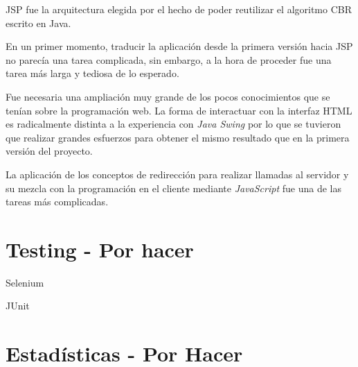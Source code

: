 JSP fue la arquitectura elegida por el hecho de poder reutilizar el algoritmo CBR escrito en Java.

En un primer momento, traducir la aplicación desde la primera versión hacia JSP no parecía una tarea complicada, sin embargo, a la hora de proceder fue una tarea más larga y tediosa de lo esperado.

Fue necesaria una ampliación muy grande de los pocos conocimientos que se tenían sobre la programación web. La forma de interactuar con la interfaz HTML es radicalmente distinta a la experiencia con \emph{Java Swing} por lo que se tuvieron que realizar grandes esfuerzos para obtener el mismo resultado que en la primera versión del proyecto.

La aplicación de los conceptos de redirección para realizar llamadas al servidor y su mezcla con la programación en el cliente mediante \emph{JavaScript} fue una de las tareas más complicadas.


\section{Testing - Por hacer}

Selenium

JUnit

\section{Estadísticas - Por Hacer}

